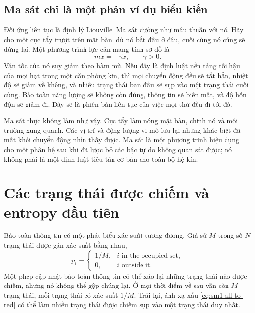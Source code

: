 \subsection{Ma sát chỉ là một phản ví dụ biểu kiến}

Đối ứng liên tục là định lý Liouville. Ma sát dường như mâu thuẫn với nó. Hãy cho một cục tẩy trượt trên mặt bàn; dù nó bắt đầu ở đâu, cuối cùng nó cũng sẽ dừng lại. Một phương trình lực cản mang tính sơ đồ là
\begin{equation}
 m\ddot x=-\gamma\dot x,
 \qquad \gamma>0.
 \label{eq:sm1-drag}
\end{equation}
Vận tốc của nó suy giảm theo hàm mũ. Nếu đây là định luật nền tảng tối hậu của mọi hạt trong một căn phòng kín, thì mọi chuyển động đều sẽ tắt hẳn, nhiệt độ sẽ giảm về không, và nhiều trạng thái ban đầu sẽ sụp vào một trạng thái cuối cùng. Bảo toàn năng lượng sẽ không còn đúng, thông tin sẽ biến mất, và độ hỗn độn sẽ giảm đi. Đây sẽ là phiên bản liên tục của việc mọi thứ đều đi tới đỏ.

Ma sát thực không làm như vậy. Cục tẩy làm nóng mặt bàn, chính nó và môi trường xung quanh. Các vị trí và động lượng vi mô lưu lại những khác biệt đã mất khỏi chuyển động nhìn thấy được. Ma sát là một phương trình hiệu dụng cho một phân hệ sau khi đã lược bỏ các bậc tự do không quan sát được; nó không phải là một định luật tiêu tán cơ bản cho toàn bộ hệ kín.

\begin{classroomqa}
\end{classroomqa}

\section{Các trạng thái được chiếm và entropy đầu tiên}

Bảo toàn thông tin có một phát biểu xác suất tương đương. Giả sử \(M\) trong số \(N\) trạng thái được gán xác suất bằng nhau,
\begin{equation}
 p_i=
 \begin{cases}
 1/M, & i\text{ in the occupied set},\\
 0, & i\text{ outside it}.
 \end{cases}
 \label{eq:sm1-uniform-occupied}
\end{equation}
Một phép cập nhật bảo toàn thông tin có thể xáo lại những trạng thái nào được chiếm, nhưng nó không thể gộp chúng lại. Ở mọi thời điểm về sau vẫn còn \(M\) trạng thái, mỗi trạng thái có xác suất \(1/M\). Trái lại, ánh xạ xấu \eqref{eq:sm1-all-to-red} có thể làm nhiều trạng thái được chiếm sụp vào một trạng thái duy nhất.

